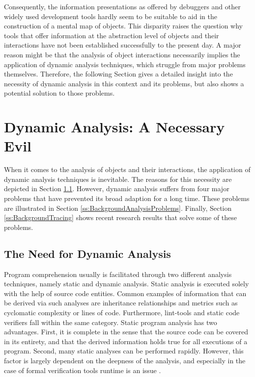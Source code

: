 Consequently, the information presentations as offered by debuggers and other widely used development tools hardly seem to be suitable to aid in the construction of a mental map of objects.
This disparity raises the question why tools that offer information at the abstraction level of objects and their interactions have not been established successfully to the present day.
A major reason might be that the analysis of object interactions necessarily implies the application of dynamic analysis techniques, which struggle from major problems themselves.
Therefore, the following Section gives a detailed insight into the necessity of dynamic analysis in this context and its problems, but also shows a potential solution to those problems.

\section[Dynamic Analysis: A Necessary Evil]{Dynamic Analysis: A Necessary Evil%
}
\label{s:BackgroundAnalysis}
When it comes to the analysis of objects and their interactions, the application of dynamic analysis techniques is inevitable.
The reasons for this necessity are depicted in Section \ref{ss:BackgroundAnalysisNeccessity}.
However, dynamic analysis suffers from four major problems that have prevented its broad adaption for a long time.
These problems are illustrated in Section \ref{ss:BackgroundAnalysisProblems}.
Finally, Section \ref{ss:BackgroundTracing} shows recent research results that solve some of these problems.

\subsection{The Need for Dynamic Analysis}
\label{ss:BackgroundAnalysisNeccessity}
Program comprehension usually is facilitated through two different analysis techniques, namely static and dynamic analysis.
Static analysis is executed solely with the help of source code entities.
Common examples of information that can be derived via such analyses are inheritance relationships and metrics such as cyclomatic complexity or lines of code.
Furthermore, lint-tools and static code verifiers fall within the same category.
Static program analysis has two advantages.
First, it is complete in the sense that the source code can be covered in its entirety, and that the derived information holds true for all executions of a program.
Second, many static analyses can be performed rapidly.
However, this factor is largely dependent on the deepness of the analysis, and especially in the case of formal verification tools runtime is an issue \cite{wichmann_industrial_1995}.

